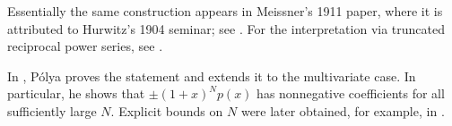 \documentclass[a4paper,11pt]{article}
\begin{document}
		
\begin{remark}
	Essentially the same construction appears in Meissner's 1911 paper,
	where it is attributed to Hurwitz's 1904 seminar; see
	\cite[Introduction and Footnote~2]{WaymentSteele2023}.
	For the interpretation via truncated reciprocal power series,
	see \cite[Section~3]{KepkaKorbelar2012}.

	In \cite{Polya1928}, Pólya proves the statement and extends it
	to the multivariate case. In particular, he shows that
	$\pm (1+x)^N p(x)$ has nonnegative coefficients for all sufficiently
	large $N$. Explicit bounds on $N$ were later obtained, for example,
	in \cite{Powers2001}.
\end{remark}
	
	\printbibliography
	
\end{document}
